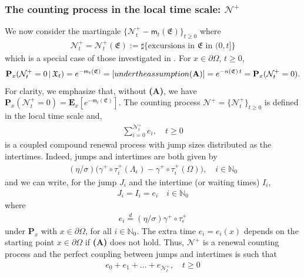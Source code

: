 \documentclass[11pt,a4paper]{article}
\begin{document}
{\subsubsection{The counting process in the local time scale: $\mathcal{N}^+$}
\label{sec:mathcalNpiu}
We now consider the martingale $\{\mathcal{N}^+_t - \mathsf{m}_t (\mathfrak{E})\}_{t\geq 0}$ where 
\begin{align*}
\mathcal{N}^+_t = \mathcal{N}^+_t(\mathfrak{E}) := \sharp\{\textrm{excursions in $\mathfrak{E}$ in $(0, t]$}\}
\end{align*}
which is a special case of those investigated in \cite{HSU86}. For $x \in \partial \Omega$, $t \geq 0$,
\begin{align*}
\mathbf{P}_x(\mathcal{N}^+_t = 0 \, | \, \mathfrak{X}_t ) = e^{- \mathsf{m}_t (\mathfrak{E})} = [\textrm{ under the assumption {\bf (A)} } ] = e^{-n(\mathfrak{E}) \, t} = \mathbf{P}_x(\mathcal{N}^+_t = 0).
\end{align*}
For clarity, we emphasize that, without {\bf (A)}, we have $\mathbf{P}_x(\mathcal{N}^+_t = 0) = \mathbf{E}_x[e^{-\mathsf{m}_t (\mathfrak{E})}]$. The counting process $\mathcal{N}^+=\{\mathcal{N}^+_t\}_{t\geq 0}$ is defined in the local time scale and,
\begin{align*}
\sum_{i=0}^{\mathcal{N}^+_t} e_i, \quad t \geq 0
\end{align*} 
is a coupled compound renewal process with  jump sizes distributed as the intertimes. Indeed, jumps and intertimes are both given by
\begin{align*}
(\eta/\sigma) \Big(\gamma^+ \circ \tau^+_i(\Lambda_\epsilon) - \gamma^+ \circ \tau^+_i(\Omega) \Big), \quad i \in \mathbb{N}_0
\end{align*}
and we can write, for the jump $J_i$ and the intertime (or waiting times) $I_i$, 
\begin{align*}
J_i = I_i = e_i \quad i \in \mathbb{N}_0
\end{align*}
where 
\begin{align*}
e_i \stackrel{d}{=} (\eta/\sigma) \gamma^+ \circ \tau^+_\epsilon
\end{align*}
under $\mathbf{P}_x$ with $x \in \partial \Omega$, for all $i \in \mathbb{N}_0$. The extra time $e_i=e_i(x)$ depends on the starting point $x \in \partial \Omega$ if {\bf (A)} does not hold. Thus, $\mathcal{N}^+$ is a renewal counting process and the perfect coupling between jumps and intertimes is such that
\begin{align*}
e_0 + e_1 + \ldots + e_{\mathcal{N}^+_t}, \quad t \geq 0

\end{align*}}
\end{document}
